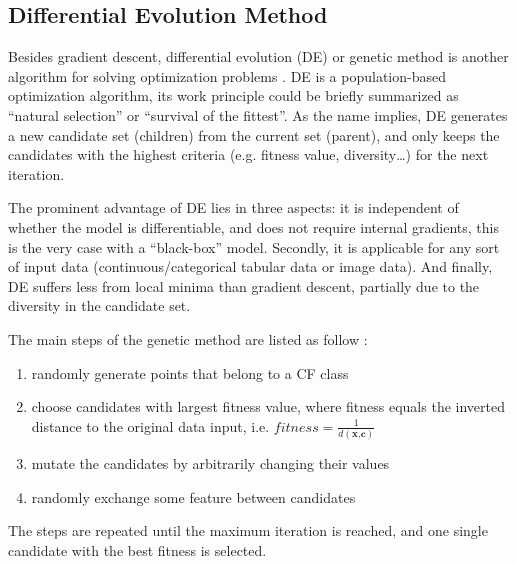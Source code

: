 \subsection{Differential Evolution Method}
Besides gradient descent, differential evolution (DE) or genetic method is another algorithm for solving optimization problems \cite{onePixel}. DE is a population-based optimization algorithm, its work principle could be briefly summarized as ``natural selection'' or ``survival of the fittest''. As the name implies, DE generates a new candidate set (children) from the current set (parent), and only keeps the candidates with the highest criteria (e.g. fitness value, diversity\dots) for the next iteration.

The prominent advantage of DE lies in three aspects: it is independent of whether the model is differentiable, and does not require internal gradients, this is the very case with a ``black-box'' model. Secondly, it is applicable for any sort of input data (continuous/categorical tabular data or image data). And finally, DE suffers less from local minima than gradient descent, partially due to the diversity in the candidate set.

The main steps of the genetic method are listed as follow \cite{certifai}:
\begin{enumerate}
  \item randomly generate points that belong to a CF class
  \item choose candidates with largest fitness value, where fitness equals the inverted distance to the original data input, i.e. $fitness=\frac{1}{d(\textbf{x,c})}$
  \item mutate the candidates by arbitrarily changing their values
  \item randomly exchange some feature between candidates
\end{enumerate}
The steps are repeated until the maximum iteration is reached, and one single candidate with the best fitness is selected.

